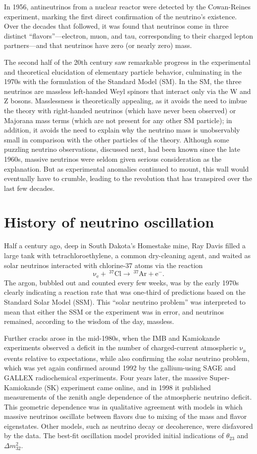 \documentclass[../thesis.tex]{subfiles}
\begin{document}
In 1956, antineutrinos from a nuclear reactor were detected by the Cowan-Reines experiment, marking the first direct confirmation of the neutrino's existence. Over the decades that followed, it was found that neutrinos come in three distinct ``flavors''---electron, muon, and tau, corresponding to their charged lepton partners---and that neutrinos have zero (or nearly zero) mass.

The second half of the 20th century saw remarkable progress in the experimental and theoretical elucidation of elementary particle behavior, culminating in the 1970s with the formulation of the Standard Model (SM). In the SM, the three neutrinos are massless left-handed Weyl spinors that interact only via the W and Z bosons. Masslessness is theoretically appealing, as it avoids the need to imbue the theory with right-handed neutrinos (which have never been observed) or Majorana mass terms (which are not present for any other SM particle); in addition, it avoids the need to explain why the neutrino mass is unobservably small in comparison with the other particles of the theory. Although some puzzling neutrino observations, discussed next, had been known since the late 1960s, massive neutrinos were seldom given serious consideration as the explanation. But as experimental anomalies continued to mount, this wall would eventually have to crumble, leading to the revolution that has transpired over the last few decades.

\section{History of neutrino oscillation}
\label{sec:history}

Half a century ago, deep in South Dakota's Homestake mine, Ray Davis filled a large tank with tetrachloroethylene, a common dry-cleaning agent, and waited as solar neutrinos interacted with chlorine-37 atoms via the reaction
\[ \mathrm{\nu_e + \ ^{37}Cl \longrightarrow \ ^{37}Ar + e^-.} \]
The argon, bubbled out and counted every few weeks, was by the early 1970s clearly indicating a reaction rate that was one-third of predictions based on the Standard Solar Model (SSM). This ``solar neutrino problem'' was interpreted to mean that either the SSM or the experiment was in error, and neutrinos remained, according to the wisdom of the day, massless.

Further cracks arose in the mid-1980s, when the IMB and Kamiokande experiments observed a deficit in the number of charged-current atmospheric $\mathrm{\nu_\mu}$ events relative to expectations, while also confirming the solar neutrino problem, which was yet again confirmed around 1992 by the gallium-using SAGE and GALLEX radiochemical experiments. Four years later, the massive Super-Kamiokande (SK) experiment came online, and in 1998 it published measurements of the zenith angle dependence of the atmospheric neutrino deficit. This geometric dependence was in qualitative agreement with models in which massive neutrinos oscillate between flavors due to mixing of the mass and flavor eigenstates. Other models, such as neutrino decay or decoherence, were disfavored by the data. The best-fit oscillation model provided initial indications of $\theta_{23}$ and $\Delta m^2_{32}$. 
\end{document}
